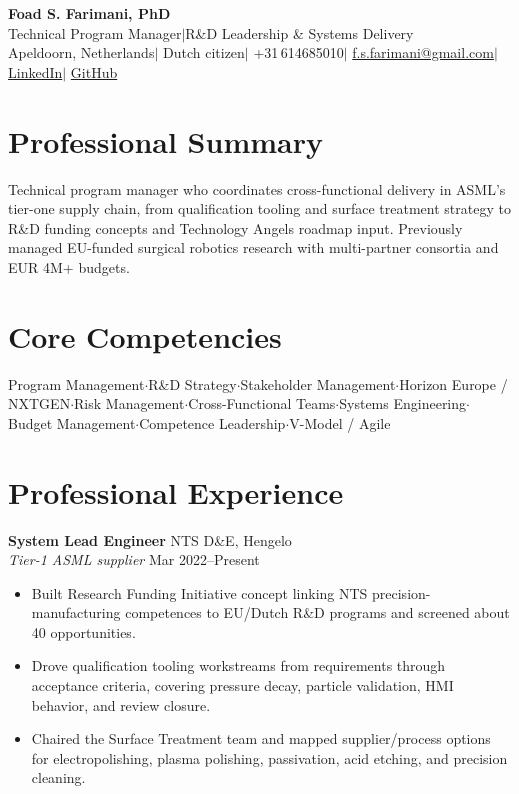 \documentclass[10pt,a4paper]{article}
\begin{document}
\begin{center}
 {\LARGE\bfseries Foad S. Farimani, PhD} \\[3pt]
 {\small Technical Program Manager\enspace$\mid$\enspace R\&D Leadership \& Systems Delivery}
 \\[3pt]
 {\footnotesize
  Apeldoorn, Netherlands\enspace$\mid$\enspace
  Dutch citizen\enspace$\mid$\enspace
  +31\,614685010\enspace$\mid$\enspace
  \href{mailto:f.s.farimani@gmail.com}{f.s.farimani@gmail.com}\enspace$\mid$\enspace
  \href{https://linkedin.com/in/fsfarimani}{LinkedIn}\enspace$\mid$\enspace
  \href{https://github.com/Foadsf}{GitHub}
 }
\end{center}

\section{Professional Summary}
Technical program manager who coordinates cross-functional delivery in ASML's tier-one supply chain, from qualification tooling and surface treatment strategy to R\&D funding concepts and Technology Angels roadmap input. Previously managed EU-funded surgical robotics research with multi-partner consortia and EUR 4M+ budgets.

\section{Core Competencies}
\begin{center}
\small Program Management\enspace$\cdot$\enspace R\&D Strategy\enspace$\cdot$\enspace Stakeholder Management\enspace$\cdot$\enspace Horizon Europe / NXTGEN\enspace$\cdot$\enspace Risk Management\enspace$\cdot$\enspace Cross-Functional Teams\enspace$\cdot$\enspace Systems Engineering\enspace$\cdot$\enspace Budget Management\enspace$\cdot$\enspace Competence Leadership\enspace$\cdot$\enspace V-Model / Agile
\end{center}

\section{Professional Experience}

\textbf{System Lead Engineer} \hfill NTS D\&E, Hengelo \\
{\small\textit{Tier-1 ASML supplier}} \hfill {\small Mar 2022--Present}
\begin{itemize}
 \item Built Research Funding Initiative concept linking NTS precision-manufacturing competences to EU/Dutch R\&D programs and screened about 40 opportunities.
 \item Drove qualification tooling workstreams from requirements through acceptance criteria, covering pressure decay, particle validation, HMI behavior, and review closure.
 \item Chaired the Surface Treatment team and mapped supplier/process options for electropolishing, plasma polishing, passivation, acid etching, and precision cleaning.
\end{itemize}
\end{document}
